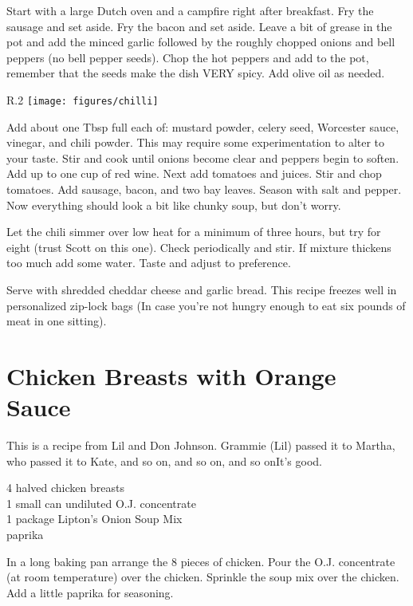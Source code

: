Start with a large Dutch oven and a campfire right after breakfast.  Fry the
sausage and set aside.  Fry the bacon and set aside.  Leave a bit of grease in
the pot and add the minced garlic followed by the roughly chopped onions and
bell peppers (no bell pepper seeds).  Chop the hot peppers and add to the pot,
remember that the seeds make the dish VERY spicy.  Add olive oil as needed.
\begin{wrapfigure}{R}{.2\textwidth}
\centering
\texttt{[image: figures/chilli]}
\end{wrapfigure}
Add about one Tbsp full each of: mustard powder, celery seed, Worcester sauce,
vinegar, and chili powder.  This may require some experimentation to alter to
your taste.  Stir and cook until onions become clear and peppers begin to
soften.  Add up to one cup of red wine.  Next add tomatoes and juices.  Stir
and chop tomatoes.  Add sausage, bacon, and two bay leaves.  Season with salt
and pepper.  Now everything should look a bit like chunky soup, but don't
worry.

Let the chili simmer over low heat for a minimum of three hours, but try for
eight (trust Scott on this one). Check periodically and stir.  If mixture
thickens too much add some water.  Taste and adjust to preference.

Serve with shredded cheddar cheese and garlic bread.  This recipe freezes well
in personalized zip-lock bags (In case you're not hungry enough to eat six
pounds of meat in one sitting).

\section{Chicken Breasts with Orange Sauce}

\begin{open}
  This is a recipe from Lil and Don Johnson.  Grammie (Lil) passed it to Martha,
  who passed it to Kate, and so on, and so on, and so on\textellipsis It's good.
\end{open}
\begin{ingredients}
  4 halved chicken breasts \\
  1 small can undiluted O.J. concentrate \\
  1 package Lipton's Onion Soup Mix \\
  paprika
\end{ingredients}
In a long baking pan arrange the 8 pieces of chicken.  Pour the O.J.
concentrate (at room temperature) over the chicken.  Sprinkle the soup mix
over the chicken.  Add a little paprika for seasoning.

